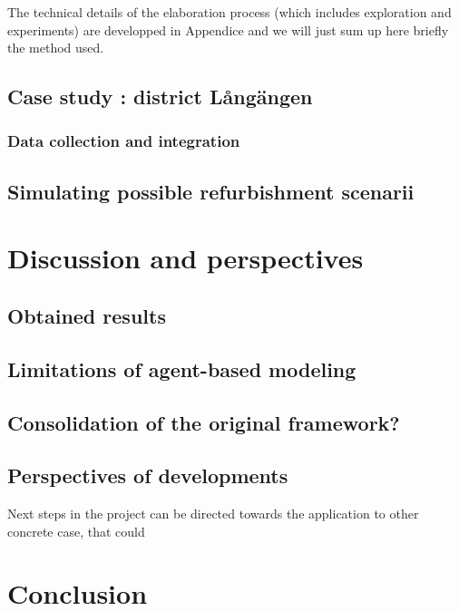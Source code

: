 \documentclass[english]{article}
\begin{document}
The technical details of the elaboration process (which includes exploration
and experiments) are developped in Appendice and we will just sum
up here briefly the method used.


\subsection{Case study : district L{\aa}ngängen}


\subsubsection{Data collection and integration}


\subsection{Simulating possible refurbishment scenarii}


\section{Discussion and perspectives}


\subsection*{Obtained results}


\subsection*{Limitations of agent-based modeling}


\subsection*{Consolidation of the original framework?}


\subsection*{Perspectives of developments}

Next steps in the project can be directed towards the application
to other concrete case, that could 


\section*{Conclusion}



\end{document}

